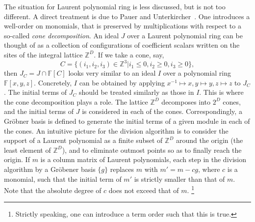 \documentclass[letterpaper,12pt]{amsart}
\theoremstyle{definition} \newtheorem{defn}{Definition}
\theoremstyle{definition} \newtheorem{rem}{Remark}
\theoremstyle{definition} \newtheorem{example}{Example}
\newcommand{\FF}{\mathbb{F}}
\newcommand{\ZZ}{\mathbb{Z}}
\begin{document}
The situation for Laurent polynomial ring is less discussed,
but is not too different.
A direct treatment is due to Pauer and Unterkircher~\cite{PauerUnterkircher1999}.
One introduces a well-order on monomials,
that is preserved by multiplications with respect to a so-called \emph{cone decomposition}.
An ideal $J$ over a Laurent polynomial ring can be thought of
as a collection of configurations of coefficient scalars written on the sites of the integral lattice $\ZZ^D$.
If we take a cone, say,
\[
 C = \{ (i_1,i_2,i_3) \in \ZZ^3 | i_1 \le 0, i_2 \ge 0, i_3 \ge 0 \} ,
\]
then $J_C = J \cap \FF[C]$ looks very similar to an ideal $I$ over a polynomial ring $\FF[x,y,z]$.
Concretely, $I$ can be obtained by applying $x^{-1} \mapsto x, y \mapsto y, z \mapsto z$ to $J_C$.
The initial terms of $J_C$ should be treated similarly as those in $I$.
This is where the cone decomposition plays a role.
The lattice $\ZZ^D$ decomposes into $2^D$ cones,
and the initial terms of $J$ is considered in each of the cones.
Correspondingly, a Gr\"obner basis is defined 
to generate the initial terms of a given module in each of the cones.
An intuitive picture for the division algorithm is 
to consider the support of a Laurent polynomial as a finite subset of $\ZZ^D$ around the origin (the least element of $\ZZ^D$),
and to eliminate outmost points so as to finally reach the origin.
If $m$ is a column matrix of Laurent polynomials,
each step in the division algorithm by a Gr\"obener basis $\{g\}$
replaces $m$ with $m' = m - c g$, where $c$ is a monomial,
such that the initial term of $m'$ is strictly smaller than that of $m$.
Note that the absolute degree of $c$ does not exceed that of $m$.%
\footnote{Strictly speaking, one can introduce a term order such that this is true.}
\end{document}
